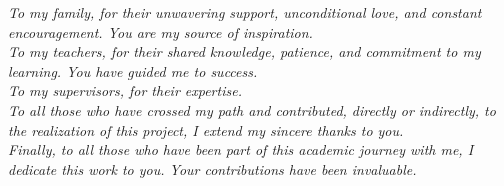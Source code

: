 \thispagestyle{empty}
\vspace*{5cm}
\begin{flushright}
\itshape
To my family, for their unwavering support, unconditional love, and constant encouragement.
You are my source of inspiration.\\[8pt]
To my teachers, for their shared knowledge, patience, and commitment to my learning. You
have guided me to success.\\[8pt]
To my supervisors, for their expertise.\\[8pt]
To all those who have crossed my path and contributed, directly or indirectly, to the realization
of this project, I extend my sincere thanks to you.\\[8pt]
Finally, to all those who have been part of this academic journey with me, I dedicate this work
to you. Your contributions have been invaluable.
\end{flushright}
\vfill
